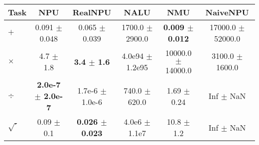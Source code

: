 \begin{tabular}{lccccc}
\toprule
Task & NPU & RealNPU & NALU & NMU & NaiveNPU\\
\midrule
$+$  & 0.091 $\pm$ 0.048 & 0.065 $\pm$ 0.039 &1700.0 $\pm$ 2900.0 & \textbf{0.009 $\pm$ 0.012} & 17000.0 $\pm$ 52000.0 \\
$\times$ & 4.7 $\pm$ 1.8 & \textbf{3.4 $\pm$ 1.6} &4.0e94 $\pm$ 1.2e95 & 10000.0 $\pm$ 14000.0 & 3100.0 $\pm$ 1600.0 \\
$\div$  & \textbf{2.0e-7 $\pm$ 2.0e-7} & 1.7e-6 $\pm$ 1.0e-6 &740.0 $\pm$ 620.0 & 1.69 $\pm$ 0.24 & Inf $\pm$ NaN \\
$\sqrt{\cdot}$ & 0.09 $\pm$ 0.1 & \textbf{0.026 $\pm$ 0.023} &4.0e6 $\pm$ 1.1e7 & 10.8 $\pm$ 1.2 & Inf $\pm$ NaN \\
\bottomrule
\end{tabular}
